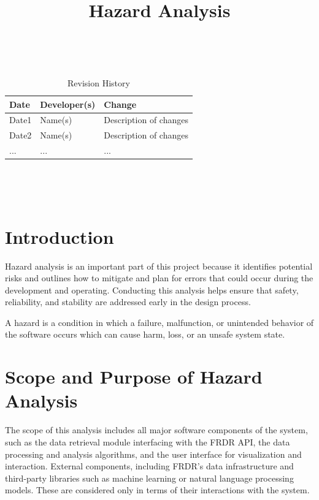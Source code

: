 \documentclass{article}
\title{Hazard Analysis\\\progname}
\author{\authname}
\date{}
\begin{document}
\maketitle
\thispagestyle{empty}

~\newpage


\begin{table}[hp]
\caption{Revision History} \label{TblRevisionHistory}
\begin{tabularx}{\textwidth}{llX}
\toprule
\textbf{Date} & \textbf{Developer(s)} & \textbf{Change}\\
\midrule
Date1 & Name(s) & Description of changes\\
Date2 & Name(s) & Description of changes\\
... & ... & ...\\
\bottomrule
\end{tabularx}
\end{table}

~\newpage

\tableofcontents

~\newpage


\section{Introduction}

Hazard analysis is an important part of this project because it identifies potential risks and outlines how to mitigate and plan for errors that could occur during the development and operating. Conducting this analysis helps ensure that safety, reliability, and stability are addressed early in the design process.

A hazard is a condition in which a failure, malfunction, or unintended behavior of the software occurs which can cause harm, loss, or an unsafe system state.

\section{Scope and Purpose of Hazard Analysis}

The scope of this analysis includes all major software components of the system, such as the data retrieval module interfacing with the FRDR API, the data processing and analysis algorithms, and the user interface for visualization and interaction. External components, including FRDR’s data infrastructure and third-party libraries such as machine learning or natural language processing models. These are considered only in terms of their interactions with the system.
\end{document}
